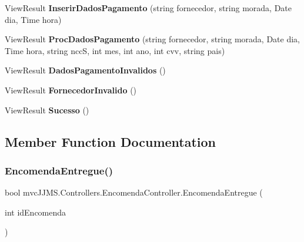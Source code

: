 \begin{DoxyCompactItemize}
\mbox{\label{classmvc_j_j_m_s_1_1_controllers_1_1_encomenda_controller_a9898fcedd4648f7a73d85dfc6e58ea6e}} 
View\+Result {\bfseries Inserir\+Dados\+Pagamento} (string fornecedor, string morada, Date dia, Time hora)
\item 
\mbox{\label{classmvc_j_j_m_s_1_1_controllers_1_1_encomenda_controller_a5e9ff72acf751edbbace575060e434f1}} 
View\+Result {\bfseries Proc\+Dados\+Pagamento} (string fornecedor, string morada, Date dia, Time hora, string nccS, int mes, int ano, int cvv, string pais)
\item 
\mbox{\label{classmvc_j_j_m_s_1_1_controllers_1_1_encomenda_controller_a0ed9836d7404d96d73effb30f5bb38c0}} 
View\+Result {\bfseries Dados\+Pagamento\+Invalidos} ()
\item 
\mbox{\label{classmvc_j_j_m_s_1_1_controllers_1_1_encomenda_controller_af1ffc3ade26ffaeb8a51456d7f4af930}} 
View\+Result {\bfseries Fornecedor\+Invalido} ()
\item 
\mbox{\label{classmvc_j_j_m_s_1_1_controllers_1_1_encomenda_controller_ab027738b2e4dfce7c7f19c6cf13cf078}} 
View\+Result {\bfseries Sucesso} ()
\end{DoxyCompactItemize}


\subsection{Member Function Documentation}
\mbox{\label{classmvc_j_j_m_s_1_1_controllers_1_1_encomenda_controller_a7aa095cf3c1afa66cb3b53cf58d0973d}} 
\subsubsection{\texorpdfstring{Encomenda\+Entregue()}{EncomendaEntregue()}}
{\footnotesize\ttfamily bool mvc\+J\+J\+M\+S.\+Controllers.\+Encomenda\+Controller.\+Encomenda\+Entregue (\begin{DoxyParamCaption}\item[{int}]{id\+Encomenda }\end{DoxyParamCaption})\hspace{0.3cm}{\ttfamily [inline]}}



